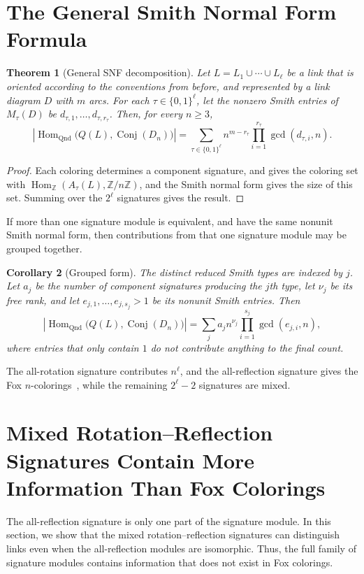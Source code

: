 \documentclass[11pt]{article}
\newtheorem{theorem}{Theorem}[section]
\newtheorem{corollary}[theorem]{Corollary}
\theoremstyle{definition}
\newcommand{\Z}{\mathbb{Z}}
\newcommand{\Conj}{\operatorname{Conj}}
\newcommand{\HomQnd}{\operatorname{Hom}_{\mathrm{Qnd}}}
\newcommand{\HomZ}{\operatorname{Hom}_{\Z}}
\begin{document}
\section{The General Smith Normal Form Formula}

\begin{theorem}[General SNF decomposition]
Let $L=L_1\cup\cdots\cup L_\ell$ be a link that is oriented according to the conventions from before, and represented by a link diagram $D$ with $m$ arcs. For each $\tau\in\{0,1\}^\ell$, let the nonzero Smith entries of $M_\tau(D)$ be $d_{\tau,1},\ldots,d_{\tau,r_\tau}$. Then, for every $n\geq3$,
\[
\left|\HomQnd\bigl(Q(L),\Conj(D_n)\bigr)\right|
=
\sum_{\tau\in\{0,1\}^\ell}
n^{m-r_\tau}
\prod_{i=1}^{r_\tau}\gcd(d_{\tau,i},n).
\]
\end{theorem}

\begin{proof}
Each coloring determines a component signature, and gives the coloring set with $\HomZ(A_\tau(L),\Z/n\Z)$, and the Smith normal form gives the size of this set. Summing over the $2^\ell$ signatures gives the result.
\end{proof}

If more than one signature module is equivalent, and have the same nonunit Smith normal form, then contributions from that one signature module may be grouped together.

\begin{corollary}[Grouped form]
The distinct reduced Smith types are indexed by $j$. Let $a_j$ be the number of component signatures producing the $j$th type, let $\nu_j$ be its free rank, and let $e_{j,1},\ldots,e_{j,s_j}>1$ be its nonunit Smith entries. Then
\[
\left|\HomQnd\bigl(Q(L),\Conj(D_n)\bigr)\right|
=
\sum_j a_jn^{\nu_j}\prod_{i=1}^{s_j}\gcd(e_{j,i},n),
\]
where entries that only contain $1$ do not contribute anything to the final count.
\end{corollary}

The all-rotation signature contributes $n^\ell$, and the all-reflection signature gives the Fox $n$-colorings~\cite[Section~2.1]{kauffman}, while the remaining $2^\ell-2$ signatures are mixed.

\section{Mixed Rotation--Reflection Signatures Contain More Information Than Fox Colorings}

The all-reflection signature is only one part of the signature module. In this section, we show that the mixed rotation--reflection signatures can distinguish links even when the all-reflection modules are isomorphic. Thus, the full family of signature modules contains information that does not exist in Fox colorings.
\end{document}
